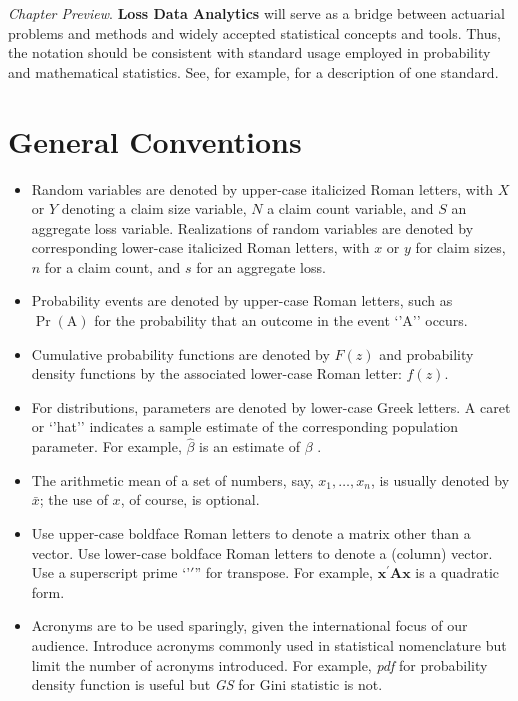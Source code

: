 \documentclass[]{book}
\providecommand{\tightlist}{%
  \setlength{\itemsep}{0pt}\setlength{\parskip}{0pt}}
\theoremstyle{definition}
\theoremstyle{definition}
\theoremstyle{definition}
\theoremstyle{remark}
\begin{document}
\emph{Chapter Preview}. \textbf{Loss Data Analytics} will serve as a
bridge between actuarial problems and methods and widely accepted
statistical concepts and tools. Thus, the notation should be consistent
with standard usage employed in probability and mathematical statistics.
See, for example, \citep{halperin1965recommended} for a description of
one standard.

\section{General Conventions}\label{S:General}

\begin{itemize}
\tightlist
\item
  Random variables are denoted by upper-case italicized Roman letters,
  with \(X\) or \(Y\) denoting a claim size variable, \(N\) a claim
  count variable, and \(S\) an aggregate loss variable. Realizations of
  random variables are denoted by corresponding lower-case italicized
  Roman letters, with \(x\) or \(y\) for claim sizes, \(n\) for a claim
  count, and \(s\) for an aggregate loss.
\item
  Probability events are denoted by upper-case Roman letters, such as
  \(\Pr(\mathrm{A})\) for the probability that an outcome in the event
  `'A'' occurs.
\item
  Cumulative probability functions are denoted by \(F(z)\) and
  probability density functions by the associated lower-case Roman
  letter: \(f(z)\).
\item
  For distributions, parameters are denoted by lower-case Greek letters.
  A caret or `'hat'' indicates a sample estimate of the corresponding
  population parameter. For example, \(\hat{\beta}\) is an estimate of
  \(\beta\) .
\item
  The arithmetic mean of a set of numbers, say, \(x_1, \ldots, x_n\), is
  usually denoted by \(\bar{x}\); the use of \(x\), of course, is
  optional.
\item
  Use upper-case boldface Roman letters to denote a matrix other than a
  vector. Use lower-case boldface Roman letters to denote a (column)
  vector. Use a superscript prime `'\(\prime\)'' for transpose. For
  example, \(\mathbf{x}^{\prime} \mathbf{A} \mathbf{x}\) is a quadratic
  form.
\item
  Acronyms are to be used sparingly, given the international focus of
  our audience. Introduce acronyms commonly used in statistical
  nomenclature but limit the number of acronyms introduced. For example,
  \emph{pdf} for probability density function is useful but \emph{GS}
  for Gini statistic is not.
\end{itemize}
\end{document}
